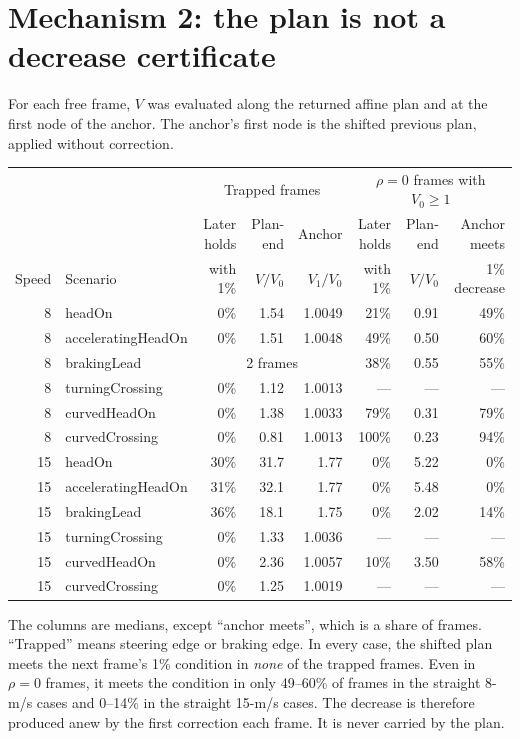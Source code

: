 \documentclass[11pt]{article}
\begin{document}
\section{Mechanism 2: the plan is not a decrease certificate}
For each free frame, $V$ was evaluated along the returned affine plan and at
the first node of the anchor. The anchor's first node is the shifted previous
plan, applied without correction.
\begin{center}\footnotesize
\begin{tabular}{rlrrrrrr}
\toprule
 & & \multicolumn{3}{c}{Trapped frames} & \multicolumn{3}{c}{$\rho=0$ frames with $V_0\ge1$}\\
 & & Later holds & Plan-end & Anchor & Later holds & Plan-end & Anchor meets\\
Speed & Scenario & with 1\% & $V/V_0$ & $V_1/V_0$ & with 1\% & $V/V_0$ & 1\% decrease\\
\midrule
8 & headOn & 0\% & 1.54 & 1.0049 & 21\% & 0.91 & 49\%\\
8 & acceleratingHeadOn & 0\% & 1.51 & 1.0048 & 49\% & 0.50 & 60\%\\
8 & brakingLead & \multicolumn{3}{c}{2 frames} & 38\% & 0.55 & 55\%\\
8 & turningCrossing & 0\% & 1.12 & 1.0013 & --- & --- & ---\\
8 & curvedHeadOn & 0\% & 1.38 & 1.0033 & 79\% & 0.31 & 79\%\\
8 & curvedCrossing & 0\% & 0.81 & 1.0013 & 100\% & 0.23 & 94\%\\
15 & headOn & 30\% & 31.7 & 1.77 & 0\% & 5.22 & 0\%\\
15 & acceleratingHeadOn & 31\% & 32.1 & 1.77 & 0\% & 5.48 & 0\%\\
15 & brakingLead & 36\% & 18.1 & 1.75 & 0\% & 2.02 & 14\%\\
15 & turningCrossing & 0\% & 1.33 & 1.0036 & --- & --- & ---\\
15 & curvedHeadOn & 0\% & 2.36 & 1.0057 & 10\% & 3.50 & 58\%\\
15 & curvedCrossing & 0\% & 1.25 & 1.0019 & --- & --- & ---\\
\bottomrule
\end{tabular}\end{center}
The columns are medians, except ``anchor meets'', which is a share of frames.
``Trapped'' means steering edge or braking edge. In every case, the shifted
plan meets the next frame's 1\% condition in \emph{none} of the trapped frames.
Even in $\rho=0$ frames, it meets the condition in only 49--60\% of frames in
the straight 8-m/s cases and 0--14\% in the straight 15-m/s cases.
The decrease is therefore produced anew by the first correction each frame. It
is never carried by the plan.
\end{document}
